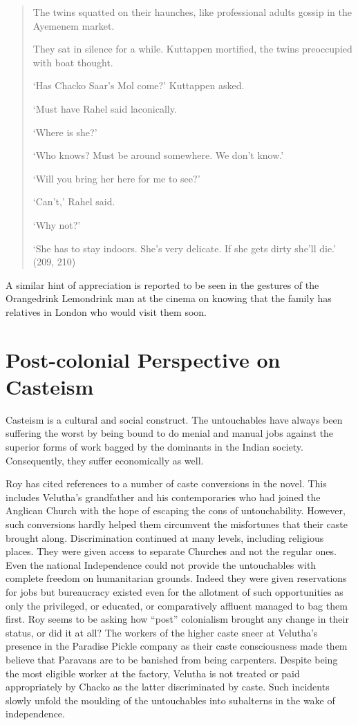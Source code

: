 \begin{quote}
  The twins squatted on their haunches, like professional adults gossip in the Ayemenem market.

  They sat in silence for a while. Kuttappen mortified, the twins preoccupied with boat thought. 

  ‘Has Chacko Saar’s Mol come?’ Kuttappen asked.
  
  ‘Must have Rahel said laconically. 
  
  ‘Where is she?’ 

  ‘Who knows? Must be around somewhere. We don’t know.’ 

  ‘Will you bring her here for me to see?’ 

  ‘Can’t,’ Rahel said. 

  ‘Why not?’ 

  ‘She has to stay indoors. She’s very delicate. If she gets dirty she’ll die.’ (209, 210)
\end{quote}

A similar hint of appreciation is reported to be seen in the gestures of the Orangedrink Lemondrink man at the cinema on knowing that the family has relatives in London who would visit them soon. 

\section{Post-colonial Perspective on Casteism}

Casteism is a cultural and social construct. The untouchables have always been suffering the worst by being bound to do menial and manual jobs against the superior forms of work bagged by the dominants in the Indian society. Consequently, they suffer economically as well.

Roy has cited references to a number of caste conversions in the novel. This includes Velutha’s grandfather and his contemporaries who had joined the Anglican Church with the hope of escaping the cons of untouchability. However, such conversions hardly helped them circumvent the misfortunes that their caste brought along. Discrimination continued at many levels, including religious places. They were given access to separate Churches and not the regular ones. Even the national Independence could not provide the untouchables with complete freedom on humanitarian grounds. Indeed they were given reservations for jobs but bureaucracy existed even for the allotment of such opportunities as only the privileged, or educated, or comparatively affluent managed to bag them first. Roy seems to be asking how “post” colonialism brought any change in their status, or did it at all? The workers of the higher caste sneer at Velutha’s presence in the Paradise Pickle company as their caste consciousness made them believe that Paravans are to be banished from being carpenters. Despite being the most eligible worker at the factory, Velutha is not treated or paid appropriately by Chacko as the latter discriminated by caste. Such incidents slowly unfold the moulding of the untouchables into subalterns in the wake of independence. 

